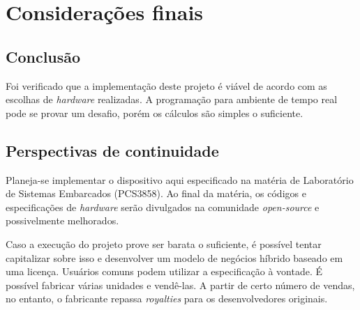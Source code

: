 \chapter{Considerações finais}
\label{CAP6}


\section{Conclusão}
Foi verificado que a implementação deste projeto é viável de acordo com as escolhas de \textit{hardware} realizadas. A programação para ambiente de tempo real pode se provar um desafio, porém os cálculos são simples o suficiente. 

\section{Perspectivas de continuidade}
Planeja-se implementar o dispositivo aqui especificado na matéria de Laboratório de Sistemas Embarcados (PCS3858). Ao final da matéria, os códigos e especificações de \textit{hardware} serão divulgados na comunidade \textit{open-source} e possivelmente melhorados.

Caso a execução do projeto prove ser barata o suficiente, é possível tentar capitalizar sobre isso e desenvolver um modelo de negócios híbrido baseado em uma licença. Usuários comuns podem utilizar a especificação à vontade. É possível fabricar várias unidades e vendê-las. A partir de certo número de vendas, no entanto, o fabricante repassa \textit{royalties} para os desenvolvedores originais. 
